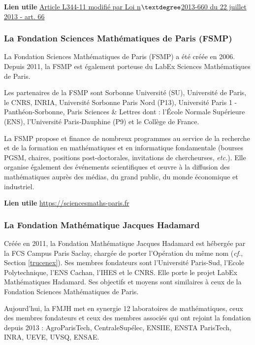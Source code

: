 \textbf{Lien utile\hspace{.5em}}
\href{hhttps://www.legifrance.gouv.fr/codes/id/LEGISCTA000027748290}{Article L344-11 modifi\'e par Loi n$\textdegree$2013-660 du 22 juillet 2013 - art. 66}

\subsubsection{La Fondation Sciences Math\'ematiques de Paris (FSMP)}

La Fondation Sciences Math\'ematiques de Paris (FSMP) a \'et\'e cr\'e\'ee en 2006. Depuis 2011, la FSMP est \'egalement porteuse du LabEx Sciences Math\'ematiques de Paris. 

Les partenaires de la FSMP sont Sorbonne Universit\'e (SU), Universit\'e de Paris, le CNRS, INRIA, Universit\'e Sorbonne Paris Nord (P13), Universit\'e Paris 1 - Panth\'eon‑Sorbonne, Paris Sciences \& Lettres dont : l'\'Ecole Normale Sup\'erieure (ENS), l'Universit\'e Paris‑Dauphine (P9) et le Coll\`ege de France.

La FSMP propose et finance de nombreux programmes au service de la recherche et de la formation en math\'ematiques et en informatique fondamentale (bourses PGSM, chaires, positions post-doctorales,  invitations de chercheur\mp se\mp s, {\em etc.}). Elle organise \'egalement des \'ev\'enements scientifiques et {\oe}uvre \`a la diffusion des math\'ematiques aupr\`es des m\'edias, du grand public, du monde \'economique et industriel.

\textbf{Lien utile\hspace{.5em}}
\url{https://sciencesmaths-paris.fr}

\subsubsection{La Fondation Math\'ematique Jacques Hadamard}

Cr\'e\'ee en 2011, la Fondation Math\'ematique Jacques Hadamard est h\'eberg\'ee par la FCS Campus Paris Saclay, charg\'ee de porter l'Op\'eration du m\^eme nom ({\em cf.}, Section \ref{trucenex}).
Ses membres fondateurs sont l'Universit\'e Paris-Sud, l'Ecole Polytechnique, l'ENS Cachan, l'IHES et le CNRS. Elle porte le projet LabEx Math\'ematiques Hadamard. Ses objectifs
et moyens sont similaires \`a ceux de la Fondation Sciences Math\'ematiques de Paris.

Aujourd'hui, la FMJH  met en synergie 12 laboratoires de math\'ematiques, ceux des membres fondateurs et ceux des membres associ\'es qui ont rejoint la fondation depuis 2013 : AgroParisTech, CentraleSup\'elec, ENSIIE, ENSTA ParisTech, INRA, UEVE, UVSQ, ENSAE.

